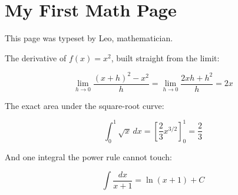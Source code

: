 
\section{My First Math Page}

This page was typeset by Leo, mathematician.

The derivative of $f(x) = x^2$, built straight from the limit:

$$ \lim_{h \to 0} \frac{(x+h)^2 - x^2}{h} = \lim_{h \to 0} \frac{2xh + h^2}{h} = 2x $$

The exact area under the square-root curve:

$$ \int_0^1 \sqrt{x} \, dx = \left[ \frac{2}{3} x^{3/2} \right]_0^1 = \frac{2}{3} $$

And one integral the power rule cannot touch:

$$ \int \frac{dx}{x+1} = \ln\left(x+1\right) + C $$
